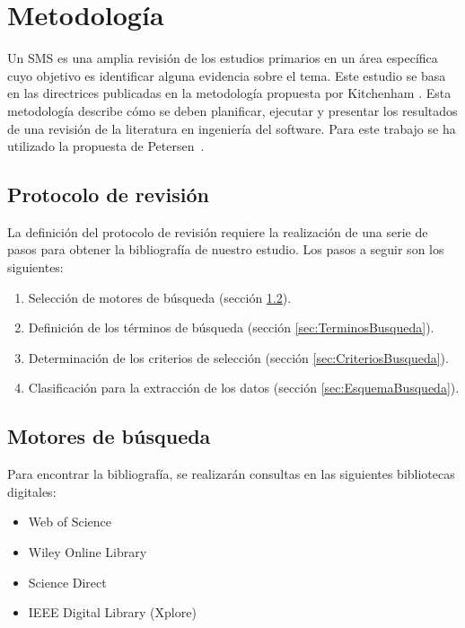 \section{Metodología}

Un SMS es una amplia revisión de los estudios primarios en un área específica cuyo objetivo es identificar alguna evidencia sobre el tema. Este estudio se basa en las directrices publicadas en la metodología propuesta por Kitchenham \cite{Kitchenham:2010}. Esta metodología describe cómo se deben planificar, ejecutar y presentar los resultados de una revisión de la literatura en ingeniería del software. Para este trabajo se ha utilizado la propuesta de Petersen~\cite{Petersen:2008}.

\subsection{Protocolo de revisión}

La definición del protocolo de revisión requiere la realización de una serie de pasos para obtener la bibliografía de nuestro estudio. Los pasos a seguir son los siguientes:
\begin{enumerate}
\item Selección de motores de búsqueda (sección \ref{sec:MotoresBusqueda}).
\item Definición de los términos de búsqueda (sección \ref{sec:TerminosBusqueda}).
\item Determinación de los criterios de selección (sección \ref{sec:CriteriosBusqueda}).
\item Clasificación para la extracción de los datos (sección \ref{sec:EsquemaBusqueda}).
\end{enumerate}


\subsection{Motores de búsqueda}
\label{sec:MotoresBusqueda}
Para encontrar la bibliografía, se realizarán consultas en las siguientes bibliotecas digitales: 
\begin{itemize}
\item Web of Science
\item Wiley Online Library
\item Science Direct
\item IEEE Digital Library (Xplore)
\end{itemize}


